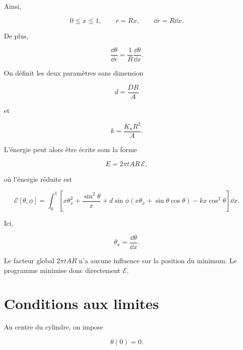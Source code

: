 \documentclass[a4paper,11pt]{article}
\begin{document}
Ainsi,

\begin{equation}
0\leq x\leq1,
\qquad
r=Rx,
\qquad
\dd r=R\dd x.
\end{equation}

De plus,

\begin{equation}
\frac{\dd\theta}{\dd r}
=
\frac{1}{R}
\frac{\dd\theta}{\dd x}.
\end{equation}

On définit les deux paramètres sans dimension

\begin{equation}
\boxed{
d=\frac{DR}{A}
}
\end{equation}

et

\begin{equation}
\boxed{
k=\frac{K_uR^2}{A}.
}
\end{equation}

L'énergie peut alors être écrite sous la forme

\begin{equation}
\boxed{
E
=
2\pi t A R\,\mathcal{E},
}
\end{equation}

où l'énergie réduite est

\begin{equation}
\boxed{
\mathcal{E}[\theta,\phi]
=
\int_0^1
\left[
x\theta_x^2
+
\frac{\sin^2\theta}{x}
+
d\sin\phi
\left(
x\theta_x
+
\sin\theta\cos\theta
\right)
-
kx\cos^2\theta
\right]
\dd x.
}
\end{equation}

Ici,

\begin{equation}
\theta_x
=
\frac{\dd\theta}{\dd x}.
\end{equation}

Le facteur global $2\pi tAR$ n'a aucune influence sur la position du
minimum. Le programme minimise donc directement $\mathcal{E}$.

\section{Conditions aux limites}

Au centre du cylindre, on impose

\begin{equation}
\boxed{
\theta(0)=0.
}
\end{equation}
\end{document}

